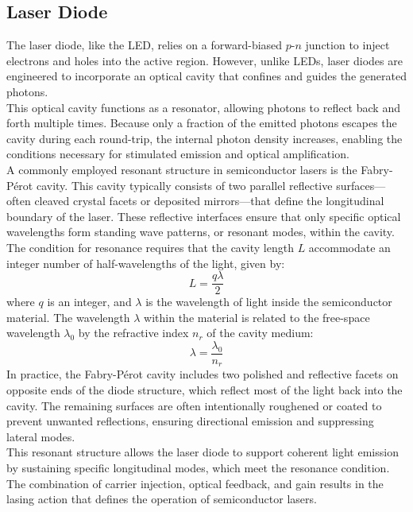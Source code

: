 \subsection{Laser Diode}
The laser diode, like the LED, relies on a forward-biased \( p\text{-}n \) junction to inject electrons and holes into the active region. However, unlike LEDs, laser diodes are engineered to incorporate an optical cavity that confines and guides the generated photons.\\
This optical cavity functions as a resonator, allowing photons to reflect back and forth multiple times. Because only a fraction of the emitted photons escapes the cavity during each round-trip, the internal photon density increases, enabling the conditions necessary for stimulated emission and optical amplification.\\
A commonly employed resonant structure in semiconductor lasers is the Fabry-Pérot cavity. This cavity typically consists of two parallel reflective surfaces—often cleaved crystal facets or deposited mirrors—that define the longitudinal boundary of the laser. These reflective interfaces ensure that only specific optical wavelengths form standing wave patterns, or resonant modes, within the cavity.\\
The condition for resonance requires that the cavity length \( L \) accommodate an integer number of half-wavelengths of the light, given by:
\begin{equation}
	L = \frac{q \lambda}{2}
\end{equation}
where \( q \) is an integer, and \( \lambda \) is the wavelength of light inside the semiconductor material. The wavelength \( \lambda \) within the material is related to the free-space wavelength \( \lambda_0 \) by the refractive index \( n_r \) of the cavity medium:
\begin{equation}
	\lambda = \frac{\lambda_0}{n_r}
\end{equation}
In practice, the Fabry-Pérot cavity includes two polished and reflective facets on opposite ends of the diode structure, which reflect most of the light back into the cavity. The remaining surfaces are often intentionally roughened or coated to prevent unwanted reflections, ensuring directional emission and suppressing lateral modes.\\
This resonant structure allows the laser diode to support coherent light emission by sustaining specific longitudinal modes, which meet the resonance condition. The combination of carrier injection, optical feedback, and gain results in the lasing action that defines the operation of semiconductor lasers.\\
